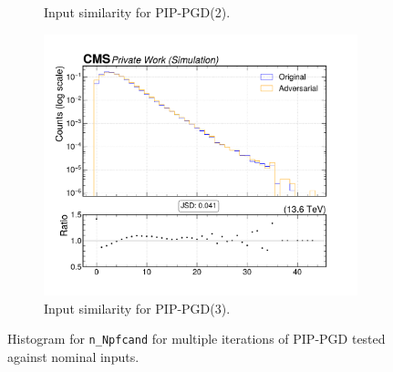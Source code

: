 \begin{figure}[htbp]
\begin{subfigure}[t]{0.32\textwidth}
    \caption*{Input similarity for PIP-PGD(2).}
  \end{subfigure}\hfill
  \begin{subfigure}[t]{0.32\textwidth}
    \includegraphics[width=\linewidth]{media/output/features/compare/combined_it_3/cmp_global_features_n_Npfcand.pdf}
    \caption*{Input similarity for PIP-PGD(3).}
  \end{subfigure}

  \caption*{Histogram for \texttt{n\_Npfcand} for multiple iterations of PIP-PGD tested against nominal inputs.}
  \label{fig:combined_input_n_Npfcand}
\end{figure}

